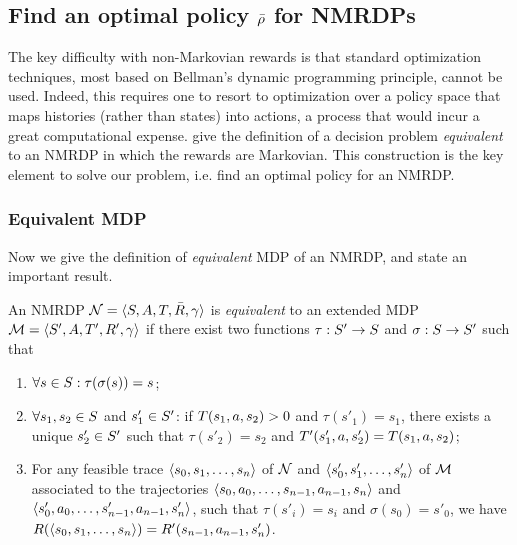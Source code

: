 \subsection{Find an optimal policy $\bar{\rho}$ for NMRDPs}\label{nmrdp-find-optimal-policy}
The  key  difficulty  with  non-Markovian rewards  is  that
standard optimization techniques, most based on Bellman's \citep{Bellman:1957} 
dynamic  programming  principle,  cannot be used. Indeed, this requires one to resort to optimization over a policy space that maps histories
(rather than states)  into actions, a process that would incur a great 
computational expense. \citep{bacchus1996rewarding} give the definition of 
a decision  problem \emph{equivalent} to an NMRDP  in  which  the  rewards  are
Markovian. This construction is the key element to solve our problem,
i.e. find an optimal policy for an NMRDP.


\subsubsection{Equivalent MDP}
Now we give the definition of \emph{equivalent} MDP of an NMRDP, and state an important result. 

\begin{definition}
	\label{nmrdp-mdp-equivalence}
	An NMRDP $\mathcal{N} = \langle S, A, T, \bar{R}, \gamma \rangle$ is \emph{equivalent} to an extended
	MDP $\mathcal{M} = \langle S', A, T', R', \gamma \rangle$ if there exist two functions 
	$\tau: S' \to S$ and $\sigma: S\to S'$ such that
	\begin{enumerate}
		\item $\forall s \in S: \tau (\sigma(s)) = s$; \label{nmrdp-mdp-equivalence-cond1}
		\item $\forall s_1, s_2 \in S$ and $s_1' \in S'$: if $T(s_1 , a, s_2 ) > 0$ and $\tau (s'_1) =
		s_1$, there exists a unique $s'_2 \in S'$ such that $\tau (s'_2 ) = s_2$ and
		$T'(s'_1 , a, s'_2 ) = T(s_1, a, s_2 )$;
		\label{nmrdp-mdp-equivalence-cond2}
		\item For any feasible trace $\langle s_0, s_1, \dots, s_n \rangle$ of $\mathcal{N}$
		and $\langle s'_0, s'_1, \dots, s'_n \rangle$ of $\mathcal{M}$ associated to the trajectories $\langle s_0, a_0, \dots, s_{n-1}, a_{n-1}, s_n \rangle$ and $\langle s'_0, a_0, \dots, s'_{n-1}, a_{n-1}, s'_n \rangle$, such that $\tau(s'_i) = s_i$
		and $\sigma(s_0) = s'_0$, we have $R(\langle s_0, s_1, \dots, s_n \rangle) =
		R'(s_{n-1}, a_{n-1}, s'_n)$.
		\label{nmrdp-mdp-equivalence-cond3}	
	\end{enumerate}
\end{definition}

